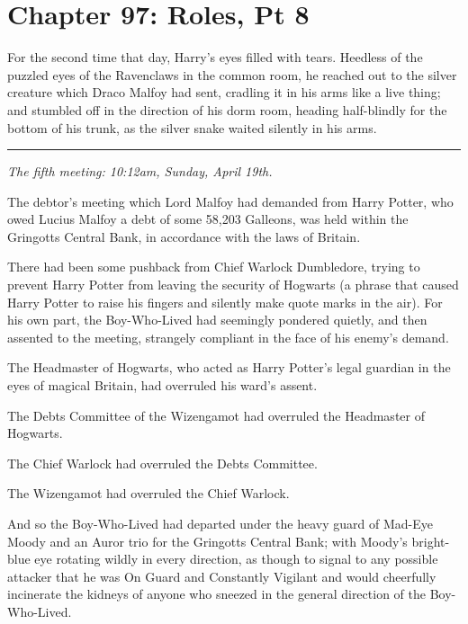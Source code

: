 \chapter{Chapter 97: Roles, Pt 8}
For the second time that day, Harry's eyes filled with tears. Heedless of the puzzled eyes of the Ravenclaws in the common room, he reached out to the silver creature which Draco Malfoy had sent, cradling it in his arms like a live thing; and stumbled off in the direction of his dorm room, heading half-blindly for the bottom of his trunk, as the silver snake waited silently in his arms.

\begin{center}\rule{3in}{0.4pt}\end{center}

\emph{The fifth meeting: 10:12am, Sunday, April 19th.}

The debtor's meeting which Lord Malfoy had demanded from Harry Potter, who owed Lucius Malfoy a debt of some 58,203 Galleons, was held within the Gringotts Central Bank, in accordance with the laws of Britain.

There had been some pushback from Chief Warlock Dumbledore, trying to prevent Harry Potter from leaving the security of Hogwarts (a phrase that caused Harry Potter to raise his fingers and silently make quote marks in the air). For his own part, the Boy-Who-Lived had seemingly pondered quietly, and then assented to the meeting, strangely compliant in the face of his enemy's demand.

The Headmaster of Hogwarts, who acted as Harry Potter's legal guardian in the eyes of magical Britain, had overruled his ward's assent.

The Debts Committee of the Wizengamot had overruled the Headmaster of Hogwarts.

The Chief Warlock had overruled the Debts Committee.

The Wizengamot had overruled the Chief Warlock.

And so the Boy-Who-Lived had departed under the heavy guard of Mad-Eye Moody and an Auror trio for the Gringotts Central Bank; with Moody's bright-blue eye rotating wildly in every direction, as though to signal to any possible attacker that he was On Guard and Constantly Vigilant and would cheerfully incinerate the kidneys of anyone who sneezed in the general direction of the Boy-Who-Lived.

